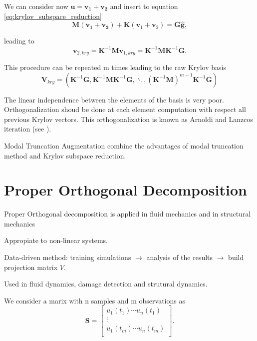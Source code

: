 \documentclass{article}
\begin{document}
We can consider now $\bm{u}=\bm{v_1} + \bm{v_2}$ and insert to equation \ref{eq:krylov_subspace_reduction}
\begin{equation}
  \bm{M}(\bm{\ddot{v}_1} + \bm{\ddot{v}_2}) + \bm{K}(\bm{v}_1 + \bm{v}_2) = \bm{G}\hat{\bm{g}},
  \label{eq:krylov_subspace_reduction}
\end{equation}

leading to 
\begin{equation}
  \bm{v}_{2, kry} = \bm{K}^{-1}\bm{M}\bm{v}_{1, kry} = \bm{K}^{-1}\bm{M}\bm{K}^{-1}\bm{G}.
  \end{equation}

This procedure can be repeated m times leading to the raw Krylov basis 
\begin{equation}
\bm{V}_{kry} = (\bm{K}^{-1}\bm{G}, \bm{K}^{-1}\bm{M}\bm{K}^{-1}\bm{G}, \ddots , (\bm{K}^{-1}\bm{M})^{m-1}\bm{K}^{-1}\bm{G})
\end{equation}

The linear independence between the elements of the basis is very poor. Orthogonalization
shoud be done at each element computation with respect all previous Krylov vectors. This orthogonalization
is known as Arnoldi and Lanzcos iteration (see \cite{geradin14}). \newline

Modal Truncation Augmentation combine the advantages of modal truncation method and 
Krylov subspace reduction. 

\section{Proper Orthogonal Decomposition}
Proper Orthogonal decomposition is applied in fluid mechanics \cite{weiss19,lassila14,taira17,berkooz13} and in structural mechanics \cite{thiene11, feeny98} \newline


Appropiate to non-linear systems. \newline

Data-driven method: training simulations $\rightarrow$ analysis of the results $\rightarrow$ build 
projection matrix $V$.\newline

Used in fluid dynamics, damage detection and strutural dynamics.\newline

We consider a marix with n samples and m observations as
\begin{equation}
  \bm{S} =
  \begin{bmatrix}
      u_1(t_1) \cdots u_n(t_1)\\
      \vdots\\
      u_1(t_m) \cdots u_n(t_m)\\
    \end{bmatrix} 
    .
\end{equation}
\end{document}
